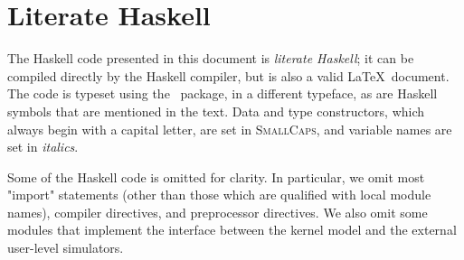 \section{Literate Haskell}

The Haskell code presented in this document is \emph{literate Haskell}; it can be compiled directly by the Haskell compiler, but is also a valid \LaTeX\ document. The code is typeset using the \lambdaTeX\ package, in a {\hsfamily different typeface}, as are Haskell symbols that are mentioned in the text. Data and type constructors, which always begin with a capital letter, are set in {\hsfamily\scshape SmallCaps}, and variable names are set in {\hsfamily\itshape italics}.

Some of the Haskell code is omitted for clarity. In particular, we omit most "import" statements (other than those which are qualified with local module names), compiler directives, and preprocessor directives. We also omit some modules that implement the interface between the kernel model and the external user-level simulators.


